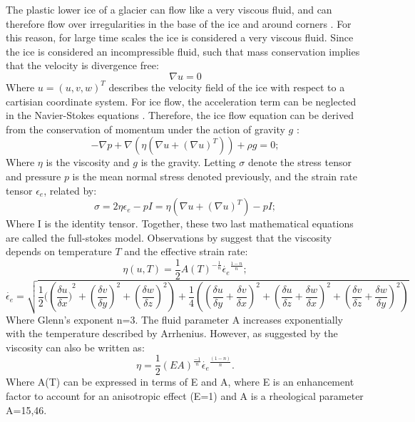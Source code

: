 \documentclass{article}
\begin{document}
The plastic lower ice of a glacier can flow like a very viscous fluid, and can therefore flow over irregularities in the base of the ice and around corners \cite[]{earle2015physical}. For this reason, for large time scales the ice is considered a very viscous fluid. Since the ice is considered an incompressible fluid, such that mass conservation implies that the velocity is divergence free:
\begin{equation}
	\nabla u=0
\end{equation}
Where $u=(u,v,w)^T$ describes the velocity field of the ice with respect to a cartisian coordinate system. For ice flow, the acceleration term can be neglected in the Navier-Stokes equations \cite[]{hutter1982mathematical}. Therefore, the ice flow equation can be derived from the conservation of momentum under the action of gravity $g$ \cite{hutter1982mathematical}:
\begin{equation}
	-\nabla p+\nabla (\eta (\nabla u+(\nabla u)^T))+\rho g = 0;
\end{equation}
Where $\eta$ is the viscosity and $g$ is the gravity. Letting $\sigma$ denote the stress tensor and pressure $p$ is the mean normal stress denoted previously, and the strain rate tensor $\epsilon_{e}$, related by:
\begin{equation}
	\sigma=2\eta \epsilon_{e}-pI = \eta (\nabla u+(\nabla u)^T)-pI; 
\end{equation}
Where I is the identity tensor. Together, these two last mathematical equations are called the full-stokes model. Observations by \cite{glen1958flow} suggest that the viscosity depends on temperature $T$ and the effective strain rate:
\begin{equation}
	\eta (u,T)=\frac{1}{2}A(T)^{-\frac{1}{n}}\dot{\epsilon_e}^{\frac{1-n}{n}};
\end{equation}
\begin{equation}
	\dot{\epsilon_e}=\sqrt{\frac{1}{2}(({\frac{\delta u}{\delta x})}^2+{(\frac{\delta v}{\delta y})}^2+{(\frac{\delta w}{\delta z})}^2)+{\frac{1}{4}({(\frac{\delta u}{\delta y}+\frac{\delta v}{\delta x})}^2+{(\frac{\delta u}{\delta z}+\frac{\delta w}{\delta x})}^2+{(\frac{\delta v}{\delta z}+\frac{\delta w}{\delta y})}^2)}}
\end{equation}
Where Glenn's exponent n=3. The fluid parameter A increases exponentially with the temperature described by Arrhenius. However, as suggested by \cite{glen1958flow} the viscosity can also be written as:
\begin{equation}
	\eta = \frac{1}{2}(EA)^\frac{-1}{n} \dot{\epsilon_e}^\frac{(1-n)}{n}.
\end{equation}
Where A(T) can be expressed in terms of E and A, where E is an enhancement factor to account for an anisotropic effect (E=1) and A is a rheological parameter A=15,46. 
\end{document}
